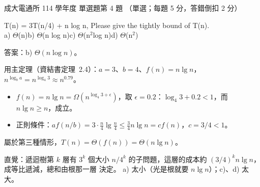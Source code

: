 \begin{pastexam}[label={px:ncku-114-cce-ds-04}]{成大電通所 114 學年度 單選題第 4 題}
（單選；每題 5 分，答錯倒扣 2 分）

T(n) = 3T(n/4) + n log n, Please give the tightly bound of T(n).\\
a) $\Theta$(n)\quad b) $\Theta$(n log n)\quad c) $\Theta$(n$^2$log n)\quad d) $\Theta$(n$^2$)
\end{pastexam}

\begin{pastsoln}
答案：b) $\Theta(n \log n)$。

用主定理（資結書定理~2.4）：$a = 3$、$b = 4$、$f(n) = n \lg n$，$n^{\log_b a} = n^{\log_4 3} \approx n^{0.79}$。
\begin{itemize}
\item $f(n) = n \lg n = \Omega(n^{\log_4 3 + \epsilon})$，取 $\epsilon = 0.2$：$\log_4 3 + 0.2 < 1$，而 $n \lg n \ge n$，成立。
\item 正則條件：$a f(n/b) = 3 \cdot \frac{n}{4} \lg \frac{n}{4} \le \frac{3}{4} n \lg n = c f(n)$，$c = 3/4 < 1$。
\end{itemize}
屬於第三種情形，$T(n) = \Theta(f(n)) = \Theta(n \lg n)$。

直覺：遞迴樹第 $k$ 層有 $3^k$ 個大小 $n/4^k$ 的子問題，這層的成本約 $(3/4)^k n \lg n$，成等比遞減，總和由根那一層
決定。 a) 太小（光是根就要 $n \lg n$）；c)、d) 太大。
\end{pastsoln}
